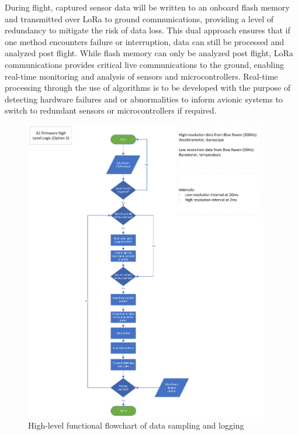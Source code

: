 During flight, captured sensor data will be written to an onboard flash memory and transmitted over LoRa to ground communications, providing a level of redundancy to mitigate the risk of data loss. This dual approach ensures that if one method encounters failure or interruption, data can still be processed and analyzed post flight. While flash memory can only be analyzed post flight, LoRa communications provides critical live communications to the ground, enabling real-time monitoring and analysis of sensors and microcontrollers. Real-time processing through the use of algorithms is to be developed with the purpose of detecting hardware failures and or abnormalities to inform avionic systems to switch to redundant sensors or microcontrollers if required.  

\begin{figure}
  \begin{center}
    \includegraphics[width=0.95\textwidth]{img/flowchart-high_level.png}
  \end{center}
  \caption{High-level functional flowchart of data sampling and logging}\label{fig:flowchart-high_level}
\end{figure}

